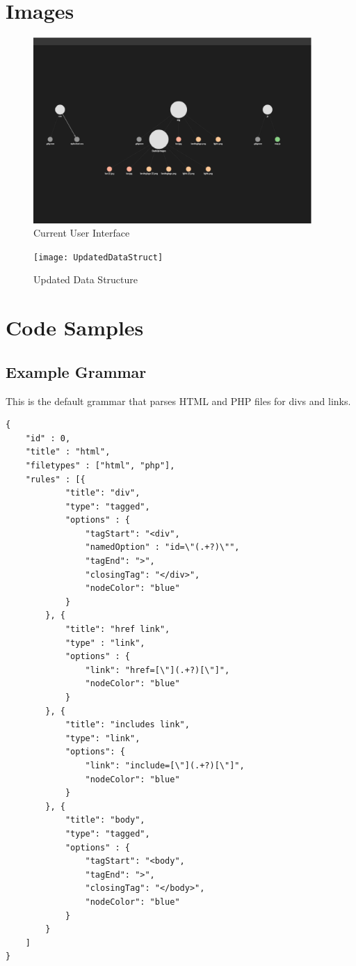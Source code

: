 \documentclass[letterpaper,10pt,titlepage,draftclsnofoot,onecolumn,onesided] {IEEEtran}
\begin{document}
\section{Images}
	\begin{figure}
		\includegraphics[width=400px]{capstoneUI1}
		\caption{Current User Interface}  %
	\end{figure}
	
	\begin{figure}
		\texttt{[image: UpdatedDataStruct]}
		\caption{Updated Data Structure}
	\end{figure}

\pagebreak
\section{Code Samples}
	\subsection{Example Grammar}
	This is the default grammar that parses HTML and PHP files for divs and links.
	
	\begin{lstlisting}
{
    "id" : 0,
    "title" : "html",
    "filetypes" : ["html", "php"],
    "rules" : [{
            "title": "div",
            "type": "tagged",
            "options" : {
                "tagStart": "<div",
                "namedOption" : "id=\"(.+?)\"",
                "tagEnd": ">",
                "closingTag": "</div>",
                "nodeColor": "blue"
            }
        }, {
            "title": "href link",
            "type" : "link",
            "options" : {
                "link": "href=[\"](.+?)[\"]",
                "nodeColor": "blue"
            }
        }, {
            "title": "includes link",
            "type": "link",
            "options": {
                "link": "include=[\"](.+?)[\"]",
                "nodeColor": "blue"
            }
        }, {
            "title": "body",
            "type": "tagged",
            "options" : {
                "tagStart": "<body",
                "tagEnd": ">",
                "closingTag": "</body>",
                "nodeColor": "blue"
            }
        }
    ]
}
	\end{lstlisting}
\end{document}
